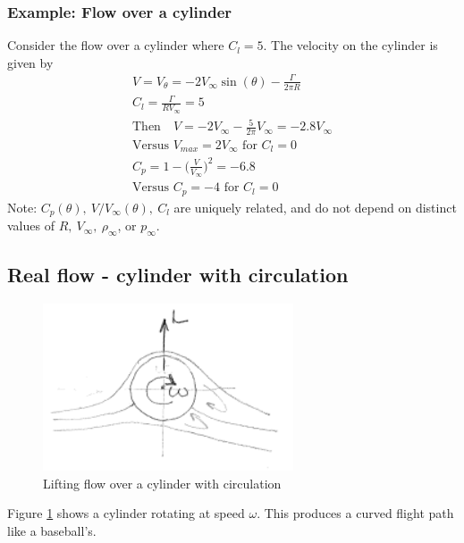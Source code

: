 \documentclass[draft=false, titlepage]{article}
\begin{document}
\subsubsection{Example: Flow over a cylinder}
Consider the flow over a cylinder where $C_l= 5$. The velocity on the cylinder is given by
\begin{gather*}
    V=V_\theta=-2V_\infty \sin(\theta) - \frac{\Gamma}{2\pi R}\\
    C_l = \frac{\Gamma}{R V_\infty} = 5\\
    \text{Then}\quad V = -2V_\infty - \frac{5}{2\pi}V_\infty = -2.8V_\infty\\
    \text{Versus } V_{max} = 2V_\infty \text{ for } C_l = 0\\
    C_p = 1-\Big( \frac{V}{V_\infty} \Big)^2 = -6.8\\
    \text{Versus } C_p = -4 \text{ for } C_l = 0
\end{gather*}
Note: $C_p(\theta),\ V/V_\infty(\theta),\ C_l$ are uniquely related, and do not depend on distinct values of $R,\ V_\infty,\ \rho_\infty$, or $p_\infty$.

\subsection{Real flow - cylinder with circulation}
\begin{figure}[ht]
    \centering
    \includegraphics[width=0.3\linewidth]{Figures/liftingFlowOverCylinder.PNG}
    \caption{Lifting flow over a cylinder with circulation}
    \label{fig:LiftingFlowOverCulinder}
\end{figure}
Figure \ref{fig:LiftingFlowOverCulinder} shows a cylinder rotating at speed $\omega$. This produces a curved flight path like a baseball's.
\end{document}
